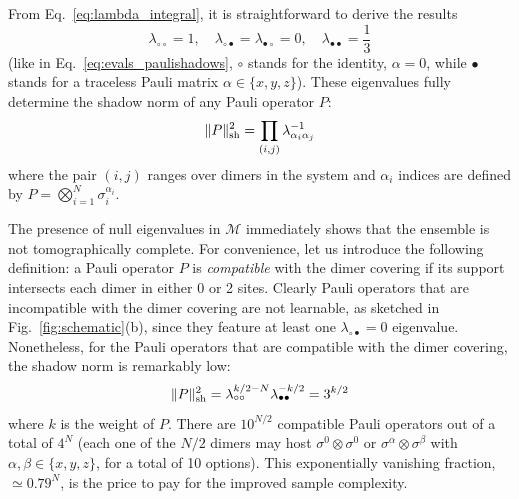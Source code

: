 \documentclass[a4paper,twocolumns,11pt,accepted=2024-03-04]{quantumarticle}
\newcommand{\shadownorm}[1]{\ensuremath{\| #1 \|_{\rm sh}}}
\begin{document}
From Eq.~\eqref{eq:lambda_integral}, it is straightforward to derive the results
\begin{equation}
    \lambda_{\circ\circ} = 1,\quad
    \lambda_{\circ\bullet} = \lambda_{\bullet\circ} = 0, \quad 
    \lambda_{\bullet\bullet} = \frac{1}{3}
    \label{eq:evals1}
\end{equation}
(like in Eq.~\eqref{eq:evals_paulishadows}, $\circ$ stands for the identity, $\alpha = 0$, while $\bullet$ stands for a traceless Pauli matrix $\alpha \in \{x,y,z\}$).
These eigenvalues fully determine the shadow norm of any Pauli operator $P$: 
\begin{equation}
    \shadownorm{P}^2 = \prod_{(i,j)} \lambda_{\alpha_i \alpha_j}^{-1}
\end{equation}
where the pair $(i,j)$ ranges over dimers in the system and $\alpha_i$ indices are defined by $P = \bigotimes_{i=1}^N \sigma^{\alpha_i}_i$.

The presence of null eigenvalues in $\mathcal{M}$ immediately shows that the ensemble is not tomographically complete.
For convenience, let us introduce the following definition: a Pauli operator $P$ is \emph{compatible} with the dimer covering if its support intersects each dimer in either 0 or 2 sites.
Clearly Pauli operators that are incompatible with the dimer covering are not learnable, as sketched in Fig.~\ref{fig:schematic}(b), since they feature at least one $\lambda_{\circ\bullet} = 0$ eigenvalue.
Nonetheless, for the Pauli operators that are compatible with the dimer covering, the shadow norm is remarkably low: 
\begin{equation}
    \shadownorm{P}^2 = \lambda_{\circ\circ}^{k/2-N} \lambda_{\bullet\bullet}^{-k/2} = 
    3^{k/2} \label{eq:shdn}
\end{equation}
where $k$ is the weight of $P$. 
There are $10^{N/2}$ compatible Pauli operators out of a total of $4^N$ (each one of the $N/2$ dimers may host $\sigma^0 \otimes \sigma^0$ or $\sigma^\alpha\otimes \sigma^\beta$ with $\alpha,\beta\in \{x,y,z\}$, for a total of 10 options). This exponentially vanishing fraction, $\simeq 0.79^N$, is the price to pay for the improved sample complexity. 
\end{document}
